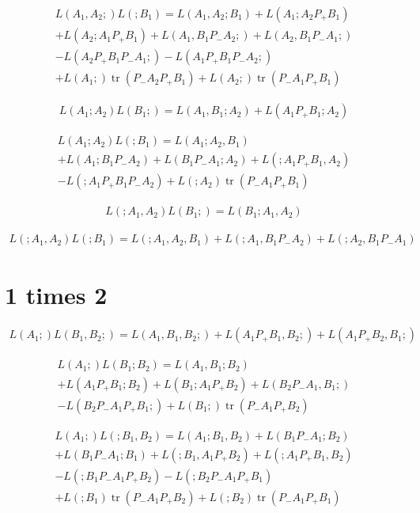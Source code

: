 \documentclass[b5paper,draft,openbib,12pt]{memoir}
\DeclareMathOperator{\tr}{tr}
\begin{document}
\begin{multline}
L(A_1,A_2;)L(;B_1)= L(A_1,A_2;B_1) + L(A_1;A_2P_+B_1)\\
+L(A_2;A_1P_+B_1) + L(A_1,B_1P_-A_2;) + L(A_2,B_1P_-A_1;)\\
-L(A_2P_+B_1P_-A_1;) -L(A_1P_+B_1P_-A_2;) \\
+L(A_1;) \tr(P_-A_2P_+B_1) + L(A_2;) \tr(P_-A_1P_+B_1)
\end{multline}

\begin{multline}
L(A_1;A_2)L(B_1;)=L(A_1,B_1;A_2) + L(A_1P_+B_1;A_2)
\end{multline}

\begin{multline}
L(A_1;A_2)L(;B_1) = L(A_1;A_2,B_1) \\
+L(A_1;B_1P_-A_2) + L(B_1P_-A_1;A_2) + L(;A_1P_+B_1,A_2)\\
-L(;A_1P_+B_1P_-A_2) + L(;A_2) \tr(P_-A_1P_+B_1)
\end{multline}

\begin{multline}
L(;A_1,A_2)L(B_1;) = L(B_1;A_1,A_2)
\end{multline}

\begin{multline}
L(;A_1,A_2)L(;B_1)=L(;A_1,A_2,B_1) + L(;A_1,B_1P_-A_2) + L(;A_2,B_1P_-A_1)
\end{multline}

\section{1 times 2}
\begin{multline}
L(A_1;)L(B_1,B_2;)= L(A_1,B_1,B_2;) + L(A_1P_+B_1,B_2;) + L(A_1P_+B_2,B_1;)
\end{multline}

\begin{multline}
L(A_1;)L(B_1;B_2)=L(A_1,B_1;B_2) \\
+L(A_1P_+B_1;B_2) + L(B_1;A_1P_+B_2) + L(B_2P_-A_1,B_1;)\\
-L(B_2P_-A_1P_+B_1;) + L(B_1;)\tr(P_-A_1P_+B_2)
\end{multline}

\begin{multline}
L(A_1;)L(;B_1,B_2)=L(A_1;B_1,B_2) + L(B_1P_-A_1;B_2) \\
+L(B_1P_-A_1;B_1) + L(;B_1,A_1P_+B_2) + L(;A_1P_+B_1,B_2)\\
-L(;B_1P_-A_1P_+B_2) - L(;B_2P_-A_1P_+B_1)\\
+L(;B_1)\tr(P_-A_1P_+B_2) + L(;B_2) \tr(P_-A_1P_+B_1)
\end{multline}
\end{document}
